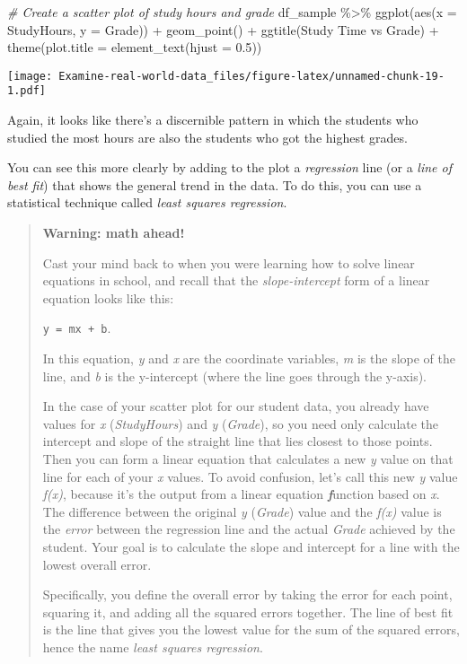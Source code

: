\documentclass[
]{article}
\newenvironment{Shaded}{\begin{snugshade}}{\end{snugshade}}
\newcommand{\AttributeTok}[1]{\textcolor[rgb]{0.77,0.63,0.00}{#1}}
\newcommand{\CommentTok}[1]{\textcolor[rgb]{0.56,0.35,0.01}{\textit{#1}}}
\newcommand{\FloatTok}[1]{\textcolor[rgb]{0.00,0.00,0.81}{#1}}
\newcommand{\FunctionTok}[1]{\textcolor[rgb]{0.00,0.00,0.00}{#1}}
\newcommand{\NormalTok}[1]{#1}
\newcommand{\SpecialCharTok}[1]{\textcolor[rgb]{0.00,0.00,0.00}{#1}}
\newcommand{\StringTok}[1]{\textcolor[rgb]{0.31,0.60,0.02}{#1}}
\begin{document}
\begin{Shaded}
\begin{Highlighting}[]
\CommentTok{\# Create a scatter plot of study hours and grade}
\NormalTok{df\_sample }\SpecialCharTok{\%\textgreater{}\%} 
  \FunctionTok{ggplot}\NormalTok{(}\FunctionTok{aes}\NormalTok{(}\AttributeTok{x =}\NormalTok{ StudyHours, }\AttributeTok{y =}\NormalTok{ Grade)) }\SpecialCharTok{+}
  \FunctionTok{geom\_point}\NormalTok{() }\SpecialCharTok{+}
  \FunctionTok{ggtitle}\NormalTok{(}\StringTok{\textquotesingle{}Study Time vs Grade\textquotesingle{}}\NormalTok{) }\SpecialCharTok{+}
  \FunctionTok{theme}\NormalTok{(}\AttributeTok{plot.title =} \FunctionTok{element\_text}\NormalTok{(}\AttributeTok{hjust =} \FloatTok{0.5}\NormalTok{))}
\end{Highlighting}
\end{Shaded}

\texttt{[image: Examine-real-world-data\_files/figure-latex/unnamed-chunk-19-1.pdf]}

Again, it looks like there's a discernible pattern in which the students
who studied the most hours are also the students who got the highest
grades.

You can see this more clearly by adding to the plot a \emph{regression}
line (or a \emph{line of best fit}) that shows the general trend in the
data. To do this, you can use a statistical technique called \emph{least
squares regression}.

\begin{quote}
\textbf{Warning: math ahead!}

Cast your mind back to when you were learning how to solve linear
equations in school, and recall that the \emph{slope-intercept} form of
a linear equation looks like this:

\texttt{y\ =\ mx\ +\ b}.

In this equation, \emph{y} and \emph{x} are the coordinate variables,
\emph{m} is the slope of the line, and \emph{b} is the y-intercept
(where the line goes through the y-axis).

In the case of your scatter plot for our student data, you already have
values for \emph{x} (\emph{StudyHours}) and \emph{y} (\emph{Grade}), so
you need only calculate the intercept and slope of the straight line
that lies closest to those points. Then you can form a linear equation
that calculates a new \emph{y} value on that line for each of your
\emph{x} values. To avoid confusion, let's call this new \emph{y} value
\emph{f(x)}, because it's the output from a linear equation
\textbf{\emph{f}}unction based on \emph{x}. The difference between the
original \emph{y} (\emph{Grade}) value and the \emph{f(x)} value is the
\emph{error} between the regression line and the actual \emph{Grade}
achieved by the student. Your goal is to calculate the slope and
intercept for a line with the lowest overall error.

Specifically, you define the overall error by taking the error for each
point, squaring it, and adding all the squared errors together. The line
of best fit is the line that gives you the lowest value for the sum of
the squared errors, hence the name \emph{least squares regression}.
\end{quote}
\end{document}
